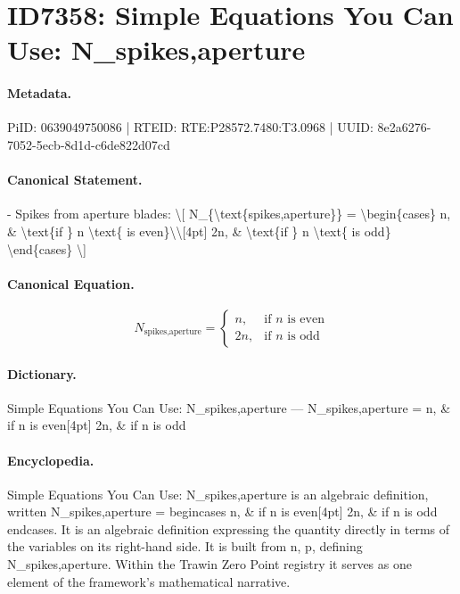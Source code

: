 \section*{ID7358: Simple Equations You Can Use: N\_spikes,aperture}
\paragraph{Metadata.}
PiID: 0639049750086 | RTEID: RTE:P28572.7480:T3.0968 | UUID: 8e2a6276-7052-5ecb-8d1d-c6de822d07cd

\paragraph{Canonical Statement.}
- Spikes from aperture blades: \textbackslash{}[ N\_\{\textbackslash{}text\{spikes,aperture\}\} = \textbackslash{}begin\{cases\} n, \& \textbackslash{}text\{if \} n \textbackslash{}text\{ is even\}\textbackslash{}\textbackslash{}[4pt] 2n, \& \textbackslash{}text\{if \} n \textbackslash{}text\{ is odd\} \textbackslash{}end\{cases\} \textbackslash{}]

\paragraph{Canonical Equation.}
\[
N_{\text{spikes,aperture}} = \begin{cases} n, & \text{if } n \text{ is even}\\[4pt] 2n, & \text{if } n \text{ is odd} \end{cases}
\]

\paragraph{Dictionary.}
Simple Equations You Can Use: N\_spikes,aperture — N\_spikes,aperture = n, \& if n is even[4pt] 2n, \& if n is odd

\paragraph{Encyclopedia.}
Simple Equations You Can Use: N\_spikes,aperture is an algebraic definition, written N\_spikes,aperture = begincases n, \& if n is even[4pt] 2n, \& if n is odd endcases. It is an algebraic definition expressing the quantity directly in terms of the variables on its right-hand side. It is built from n, p, defining N\_spikes,aperture. Within the Trawin Zero Point registry it serves as one element of the framework's mathematical narrative.

